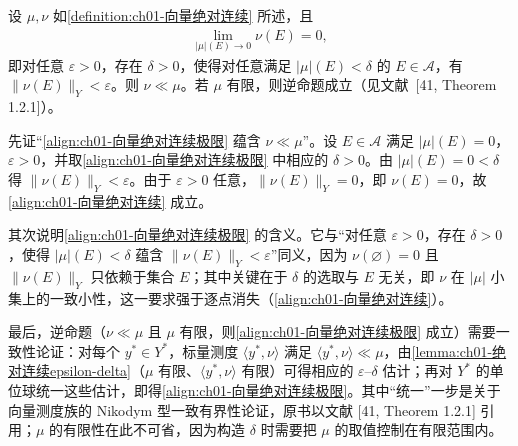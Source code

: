 \documentclass[../../main.tex]{subfiles}%
\begin{document}
\begin{remark}\label{remark:ch01-向量绝对连续}
设 $\mu,\nu$ 如\cref{definition:ch01-向量绝对连续} 所述，且
\begin{align}
\lim_{|\mu|(E)\to0}\nu(E)=0, \label{align:ch01-向量绝对连续极限}
\end{align}
即对任意 $\varepsilon>0$，存在 $\delta>0$，使得对任意满足 $|\mu|(E)<\delta$ 的 $E\in\mathcal{A}$，有 $\|\nu(E)\|_Y<\varepsilon$。则 $\nu\ll\mu$。若 $\mu$ 有限，则逆命题成立（见文献~[41, Theorem 1.2.1]）。

先证“\eqref{align:ch01-向量绝对连续极限} 蕴含 $\nu\ll\mu$”。设 $E\in\mathcal{A}$ 满足 $|\mu|(E)=0$，$\varepsilon>0$，并取\eqref{align:ch01-向量绝对连续极限} 中相应的 $\delta>0$。由 $|\mu|(E)=0<\delta$ 得 $\|\nu(E)\|_Y<\varepsilon$。由于 $\varepsilon>0$ 任意，$\|\nu(E)\|_Y=0$，即 $\nu(E)=0$，故\eqref{align:ch01-向量绝对连续} 成立。

其次说明\eqref{align:ch01-向量绝对连续极限} 的含义。它与“对任意 $\varepsilon>0$，存在 $\delta>0$，使得 $|\mu|(E)<\delta$ 蕴含 $\|\nu(E)\|_Y<\varepsilon$”同义，因为 $\nu(\varnothing)=0$ 且 $\|\nu(E)\|_Y$ 只依赖于集合 $E$；其中关键在于 $\delta$ 的选取与 $E$ 无关，即 $\nu$ 在 $|\mu|$ 小集上的一致小性，这一要求强于逐点消失（\eqref{align:ch01-向量绝对连续}）。

最后，逆命题（$\nu\ll\mu$ 且 $\mu$ 有限，则\eqref{align:ch01-向量绝对连续极限} 成立）需要一致性论证：对每个 $y^*\in Y^*$，标量测度 $\langle y^*,\nu\rangle$ 满足 $\langle y^*,\nu\rangle\ll\mu$，由\cref{lemma:ch01-绝对连续epsilon-delta}（$\mu$ 有限、$\langle y^*,\nu\rangle$ 有限）可得相应的 $\varepsilon$--$\delta$ 估计；再对 $Y^*$ 的单位球统一这些估计，即得\eqref{align:ch01-向量绝对连续极限}。其中“统一”一步是关于向量测度族的 Nikodym 型一致有界性论证，原书以文献 [41, Theorem 1.2.1] 引用；$\mu$ 的有限性在此不可省，因为构造 $\delta$ 时需要把 $\mu$ 的取值控制在有限范围内。
\end{remark}
\end{document}

